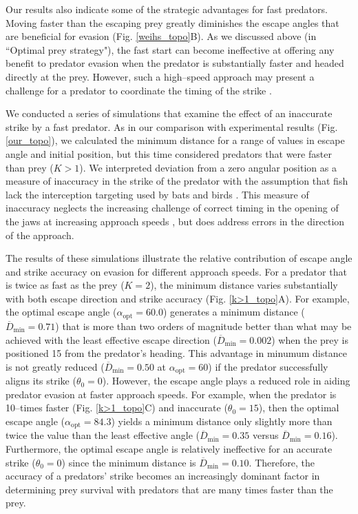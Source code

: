 \documentclass[12pt]{article}
\newcommand{\ol}{\overline}
\begin{document}
Our results also indicate some of the strategic advantages for fast predators. Moving faster than the escaping prey greatly diminishes the escape angles that are beneficial for evasion (Fig. \ref{weihs_topo}B). 
As we discussed above (in ``Optimal prey strategy"), the fast start can become ineffective at offering any benefit to predator evasion when the predator is substantially faster and headed directly at the prey. However, such a high--speed approach may present a challenge for a predator to coordinate the timing of the strike \citep{Higham:2007go, Higham:2005iu}. 

We conducted a series of simulations that examine the effect of an inaccurate strike by a fast predator. As in our comparison with experimental results (Fig. \ref{our_topo}), we calculated the minimum distance for a range of values in escape angle and initial position, but this time considered predators that were faster than prey ($K>1$). 
We interpreted deviation from a zero angular position as a measure of inaccuracy in the strike of the predator with the assumption that fish lack the interception targeting used by bats \citep{Ghose:2006dk} and birds \citep{Kane:2014fs}. This measure of inaccuracy neglects the increasing challenge of correct timing in the opening of the jaws at increasing approach speeds \citep{Kane:2014bh,Kane:2011hz}, but does address errors in the direction of the approach.

The results of these simulations illustrate the relative contribution of escape angle and strike accuracy on evasion for different approach speeds. For a predator that is twice as fast as the prey ($K=2$), the minimum distance varies substantially with both escape direction and strike accuracy (Fig. \ref{k>1_topo}A). 
For example, the optimal escape angle ($\alpha_{\text{opt}}=60.0$\textdegree) generates a minimum distance ($\ol D_{\text{min}}=0.71$) that is more than two orders of magnitude better than what may be achieved with the least effective escape direction ($\ol D_{\text{min}}=0.002$) when the prey is positioned 15\textdegree\hspace{0.5pt} from the predator's heading. 
This advantage in minumum distance is not greatly reduced ($\ol D_{\text{min}}=0.50$ at $\alpha_{\text{opt}}=60$\textdegree) if the predator successfully aligns its strike ($\theta_0=0$\textdegree). 
However, the escape angle plays a reduced role in aiding predator evasion at faster approach speeds. For example, when the predator is 10--times faster  (Fig. \ref{k>1_topo}C) and inaccurate ($\theta_0=15$\textdegree), then the optimal escape angle ($\alpha_{\text{opt}}=84.3$\textdegree) yields a minimum distance only slightly more than twice the value than the least effective angle ($\ol D_{\text{min}}=0.35$ versus $\ol D_{\text{min}}=0.16$). 
Furthermore, the optimal escape angle is relatively ineffective for an accurate strike ($\theta_0=0$\textdegree) since the minimum distance is $\ol D_{\text{min}}=0.10$. 
Therefore, the accuracy of a predators' strike becomes an increasingly dominant factor in determining prey survival with predators that are many times faster than the prey.
\end{document}
